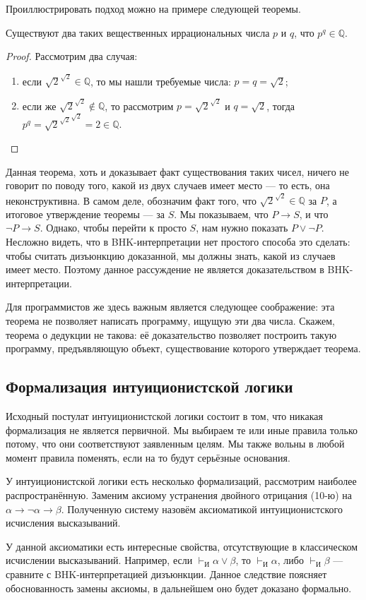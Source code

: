 Проиллюстрировать подход можно на примере следующей теоремы.

\begin{theorem}
Существуют два таких вещественных иррациональных числа $p$ и $q$, что $p^q \in \mathbb{Q}$.
\end{theorem}

\begin{proof}
Рассмотрим два случая:
\begin{enumerate}
\item если $\sqrt{2}^{\sqrt{2}} \in \mathbb{Q}$, то мы нашли требуемые числа: $p = q = \sqrt{2}$;
\item если же $\sqrt{2}^{\sqrt{2}} \notin \mathbb{Q}$, то рассмотрим $p = \sqrt{2}^{\sqrt{2}}$
и $q = \sqrt{2}$, тогда $p^q = {\sqrt{2}^{\sqrt{2}}}^{\sqrt{2}} = 2 \in \mathbb{Q}$.
\end{enumerate}
\end{proof}

Данная теорема, хоть и доказывает факт существования таких чисел, ничего не говорит по поводу
того, какой из двух случаев имеет место --- то есть, она неконструктивна. 
В самом деле, 
обозначим факт того, что $\sqrt{2}^{\sqrt{2}} \in \mathbb{Q}$ за $P$, а итоговое утверждение теоремы
--- за $S$. Мы показываем, что $P \rightarrow S$, и что $\neg P \rightarrow S$.
Однако, чтобы перейти к просто $S$, нам нужно показать $P \vee \neg P$. Несложно видеть,
что в BHK-интерпретации нет простого способа это сделать: чтобы считать дизъюнкцию доказанной,
мы должны знать, какой из случаев имеет место. Поэтому данное рассуждение не является
доказательством в BHK-интерпретации.

Для программистов же здесь важным является следующее соображение: эта теорема не 
позволяет написать программу, ищущую эти два числа. Скажем, теорема о дедукции не такова: 
её доказательство позволяет построить такую программу, предъявляющую объект,
существование которого утверждает теорема. 

\subsection*{Формализация интуиционистской логики}

Исходный постулат интуиционистской логики состоит в том, что никакая формализация не является
первичной. Мы выбираем те или иные правила только потому, что они соответствуют заявленным
целям. Мы также вольны в любой момент правила поменять, если на то будут серьёзные основания.

У интуиционистской логики есть несколько формализаций, рассмотрим наиболее распространённую.
Заменим аксиому устранения двойного отрицания (10-ю) на 
$\alpha \rightarrow \neg \alpha \rightarrow \beta$.
Полученную систему назовём аксиоматикой интуиционистского исчисления высказываний.

У данной аксиоматики есть интересные свойства, отсутствующие в классическом исчислении
высказываний. Например, если $\vdash_\texttt{И} \alpha \vee \beta$, то $\vdash_\texttt{И} \alpha$, либо
$\vdash_\texttt{И} \beta$ --- сравните с BHK-интерпретацией дизъюнкции. 
Данное следствие поясняет обоснованность замены аксиомы, в дальнейшем оно будет доказано
формально.
